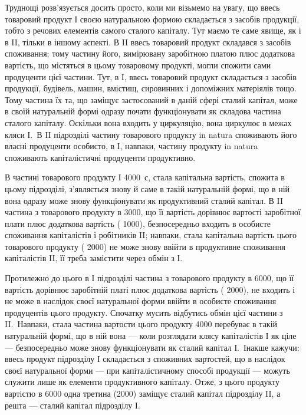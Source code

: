 

Труднощі розв’язується досить просто, коли ми візьмемо на увагу,
що ввесь товаровий продукт І своєю натуральною формою складається
з засобів продукції, тобто з речових елементів самого сталого капіталу.
Тут маємо те саме явище, як і в II, тільки в іншому аспекті. В II ввесь товаровий
продукт складався з засобів споживання; тому частину його, вимірювану
заробітною платою плюс додаткова вартість, що містяться в цьому товаровому
продукті, могли спожити сами продуценти цієї частини. Тут, в
І, ввесь товаровий продукт складається з засобів продукції, будівель, машин,
вмістищ, сировинних і допоміжних матеріялів тощо. Тому частина їх
та, що заміщує застосований в даній сфері сталий капітал, може в своїй натуральній
формі одразу почати функціонувати як складова частина сталого
капіталу. Оскільки вона входить у циркуляцію, вона циркулює в межах
кляси І.~В II підрозділі частину товарового продукту in natura споживають
його власні продуценти особисто, в І, навпаки, частину продукту
in natura споживають капіталістичні продуценти продуктивно.

В частині товарового продукту І \deq{} 4000~$с$, стала капітальна вартість,
спожита в цьому підрозділі, з’являється знову й саме в такій натуральній
формі, що в ній вона одразу може знову функціонувати як продуктивний
сталий капітал. В II частина з товарового продукту в 3000, що її вартість
дорівнює вартості заробітної плати плюс додаткова вартість (\deq{} 1000),
безпосередньо входить в особисте споживання капіталістів і робітників II;
навпаки, стала капітальна вартість цього товарового продукту (\deq{} 2000)
не може знову ввійти в продуктивне споживання капіталістів II, її треба
замістити через обмін з І.

Протилежно до цього в І підрозділі частина з товарового продукту
в 6000, що її вартість дорівнює заробітній платі плюс додаткова вартість
(\deq{} 2000), не входить і не може в наслідок своєї натуральної форми
ввійти в особисте споживання продуцентів цього продукту. Спочатку
мусить відбутись обмін цієї частини з II.~Навпаки, стала частина вартости
цього продукту \deq{} 4000 перебуває в такій натуральній формі, що в ній
вона — коли розглядати клясу капіталістів І як ціле — безпосередньо може
знову функціонувати як сталий капітал І.~Інакше кажучи: ввесь продукт
підрозділу І складається з споживних вартостей, що в наслідок своєї натуральної
форми — при капіталістичному способі продукції — можуть служити
лише як елементи продуктивного капіталу. Отже, з цього продукту
вартістю в 6000 одна третина (2000) заміщує сталий капітал підрозділу II,
а решта  — сталий капітал підрозділу І.

